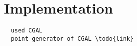 \chapter{Implementation}

\begin{verbatim}
  used CGAL
  point generator of CGAL \todo{link}
\end{verbatim}
